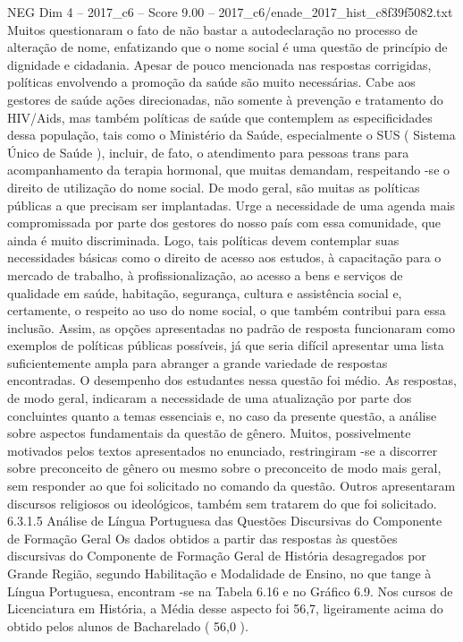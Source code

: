 \begin{textsample}{NEG Dim 4 – 2017\_c6 – Score 9.00 – 2017\_c6/enade\_2017\_hist\_c8f39f5082.txt}
Muitos questionaram o fato de não bastar a autodeclaração no processo de alteração de nome, enfatizando que o nome social é uma questão de princípio de dignidade e cidadania.
Apesar de pouco mencionada nas respostas corrigidas, políticas envolvendo a promoção da saúde são muito necessárias.
Cabe aos gestores de saúde ações direcionadas, não somente à prevenção e tratamento do HIV/Aids, mas também políticas de saúde que contemplem as especificidades dessa população, tais como o Ministério da Saúde, especialmente o SUS ( Sistema Único de Saúde ), incluir, de fato, o atendimento para pessoas trans para acompanhamento da terapia hormonal, que muitas demandam, respeitando -se o direito de utilização do nome social.
De modo geral, são muitas as políticas públicas a que precisam ser implantadas.
Urge a necessidade de uma agenda mais compromissada por parte dos gestores do nosso país com essa comunidade, que ainda é muito discriminada.
Logo, tais políticas devem contemplar suas necessidades básicas como o direito de acesso aos estudos, à capacitação para o mercado de trabalho, à profissionalização, ao acesso a bens e serviços de qualidade em saúde, habitação, segurança, cultura e assistência social e, certamente, o respeito ao uso do nome social, o que também contribui para essa inclusão.
Assim, as opções apresentadas no padrão de resposta funcionaram como exemplos de políticas públicas possíveis, já que seria difícil apresentar uma lista suficientemente ampla para abranger a grande variedade de respostas encontradas.
O desempenho dos estudantes nessa questão foi médio.
As respostas, de modo geral, indicaram a necessidade de uma atualização por parte dos concluintes quanto a temas essenciais e, no caso da presente questão, a análise sobre aspectos fundamentais da questão de gênero.
Muitos, possivelmente motivados pelos textos apresentados no enunciado, restringiram -se a discorrer sobre preconceito de gênero ou mesmo sobre o preconceito de modo mais geral, sem responder ao que foi solicitado no comando da questão.
Outros apresentaram discursos religiosos ou ideológicos, também sem tratarem do que foi solicitado. 6.3.1.5 Análise de Língua Portuguesa das Questões Discursivas do Componente de Formação Geral Os dados obtidos a partir das respostas às questões discursivas do Componente de Formação Geral de História desagregados por Grande Região, segundo Habilitação e Modalidade de Ensino, no que tange à Língua Portuguesa, encontram -se na Tabela 6.16 e no Gráfico 6.9.
Nos cursos de Licenciatura em História, a Média desse aspecto foi 56,7, ligeiramente acima do obtido pelos alunos de Bacharelado ( 56,0 ).

\end{textsample}
